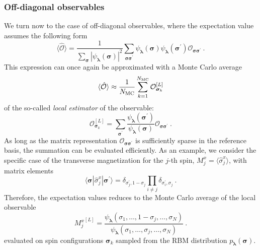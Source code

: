 \documentclass[submission, Phys, hidelnks]{SciPost}
\begin{document}
\subsubsection{Off-diagonal observables}
We turn now to the case of off-diagonal observables, where the expectation value assumes the following form
\begin{equation}
    \langle \hat{\mathcal{O}} \rangle = \frac{1}{\sum_{\bm{\sigma}} |\psi_{\bm{\lambda}}(\bm{\sigma})|^2}
    \sum_{\bm{\sigma\sigma}^\prime} \psi_{\bm{\lambda}}(\bm{\sigma})
    \psi_{\bm{\lambda}}(\bm{\sigma}^\prime)\mathcal{O}_{\bm{\sigma\sigma}^\prime}\:.
\end{equation}
This expression can once again be approximated with a Monte Carlo average 
\begin{equation}
    \langle \hat{\mathcal{O}}\rangle \approx \frac{1}{N_{\rm MC}} \sum_{k=1}^{N_{\rm MC}} \mathcal{O}^{[L]}_{\bm{\sigma}_k}
\end{equation}
of the so-called \emph{local estimator} of the observable: 
\begin{equation}
    \mathcal{O}^{[L]}_{\bm{\sigma}_k}=\sum_{\bm{\sigma}^\prime}\frac{\psi_{\bm{\lambda}}(\bm{\sigma}^\prime)}{\psi_{\bm{\lambda}}(\bm{\sigma})} \mathcal{O}_{\bm{\sigma\sigma}^\prime}\:.
\end{equation}
As long as the matrix representation $\mathcal{O}_{\bm{\sigma\sigma}^\prime}$ is sufficiently sparse in the reference basis, the summation can be evaluated efficiently. As an example, we consider the specific case of the transverse magnetization for the $j$-th spin, $M_j^x=\langle\hat{\sigma}^x_j\rangle$, with matrix elements
\begin{equation}
    \langle\bm{\sigma}|\hat{\sigma}^x_j|\bm{\sigma}^{\prime}\rangle=\delta_{\sigma_j^\prime,1-\sigma_j}\prod_{i\ne j}\delta_{\sigma_i^\prime,\sigma_j}\:.
\end{equation}
Therefore, the expectation values reduces to the Monte Carlo average of the local observable
\begin{equation}
    {M_j^x}^{[L]}=\frac{\psi_{\bm{\lambda}}(\sigma_1,\dots,1-\sigma_j,\dots,\sigma_N)}
    {\psi_{\bm{\lambda}}(\sigma_1,\dots,\sigma_j,\dots,\sigma_N)} 
\:.
\end{equation}
evaluated on spin configurations $\bm{\sigma}_k$ sampled from the RBM distribution $p_{\bm{\lambda}}(\bm{\sigma})$. 
\end{document}
